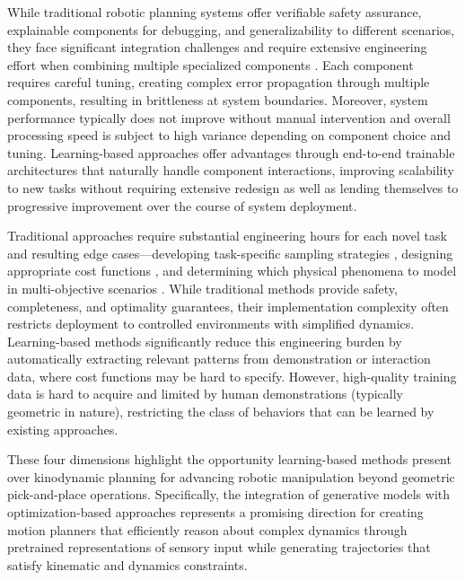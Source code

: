While traditional robotic planning systems offer verifiable safety assurance, explainable components for debugging, and generalizability to different scenarios, they face significant integration challenges and require extensive engineering effort when combining multiple specialized components \cite{abderezaei2024clutter}. Each component requires careful tuning, creating complex error propagation through multiple components, resulting in brittleness at system boundaries. Moreover, system performance typically does not improve without manual intervention and overall processing speed is subject to high variance depending on component choice and tuning.
Learning-based approaches offer advantages through end-to-end trainable architectures that naturally handle component interactions, improving scalability to new tasks without requiring extensive redesign as well as lending themselves to progressive improvement over the course of system deployment.

Traditional approaches require substantial engineering hours for each novel task and resulting edge cases---developing task-specific sampling strategies \cite{abderezaei2024clutter}, designing appropriate cost functions \cite{pasricha2024virtues}, and determining which physical phenomena to model in multi-objective scenarios \cite{pasricha2022pokerrt}. While traditional methods provide safety, completeness, and optimality guarantees, their implementation complexity often restricts deployment to controlled environments with simplified dynamics.
Learning-based methods significantly reduce this engineering burden by automatically extracting relevant patterns from demonstration or interaction data, where cost functions may be hard to specify.
However, high-quality training data is hard to acquire and limited by human demonstrations (typically geometric in nature), restricting the class of behaviors that can be learned by existing approaches.

These four dimensions highlight the opportunity learning-based methods present over kinodynamic planning for advancing robotic manipulation beyond geometric pick-and-place operations. Specifically, the integration of generative models with optimization-based approaches represents a promising direction for creating motion planners that efficiently reason about complex dynamics through pretrained representations of sensory input while generating trajectories that satisfy kinematic and dynamics constraints.